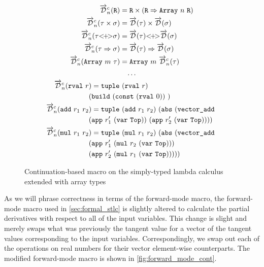   \begin{figure}
    \centering
    \begin{gather*}
      \begin{aligned}
        \overrightarrow{\mathcal{D}}^c_n(\texttt{R}) &= \texttt{R} \times (\texttt{R} \Rightarrow \texttt{Array}\ n\ \texttt{R}) \\
        \overrightarrow{\mathcal{D}}^c_n(\tau \times \sigma) &= \overrightarrow{\mathcal{D}}(\tau) \times \overrightarrow{\mathcal{D}}(\sigma) \\
        \overrightarrow{\mathcal{D}}^c_n(\tau {<}\!{+}\!{>} \sigma) &= \overrightarrow{\mathcal{D}}(\tau) {<}\!{+}\!{>} \overrightarrow{\mathcal{D}}(\sigma) \\
        \overrightarrow{\mathcal{D}}^c_n(\tau \Rightarrow \sigma) &= \overrightarrow{\mathcal{D}}(\tau) \Rightarrow \overrightarrow{\mathcal{D}}(\sigma) \\
        \overrightarrow{\mathcal{D}}^c_n(\texttt{Array}\ m\ \tau) &= \texttt{Array}\ m\ \overrightarrow{\mathcal{D}}^c_n(\tau) \\
      \end{aligned}
      \\
      \begin{gathered}
        \dots \\
        \begin{aligned}
        \overrightarrow{\mathcal{D}}^c_n(\texttt{rval}\ r&) = \texttt{tuple}\ (\texttt{rval}\ r)\ \\
          &{(\texttt{build}\ (\texttt{const}\ (\texttt{rval}\ 0))\ )} \\
        \overrightarrow{\mathcal{D}}^c_n(\texttt{add}\ r_1\ r_2&) = \texttt{tuple}\ (\texttt{add}\ r_1\ r_2)\ (\texttt{abs}\ (\texttt{vector\_add}\  \\
          &(\texttt{app}\ r_1'\ (\texttt{var}\ \texttt{Top}))\ (\texttt{app}\ r_2'\ (\texttt{var}\ \texttt{Top})))) \\
        \overrightarrow{\mathcal{D}}^c_n(\texttt{mul}\ r_1\ r_2&) = \texttt{tuple}\ (\texttt{mul}\ r_1\ r_2)\ (\texttt{abs}\ (\texttt{vector\_add}\  \\
          &(\texttt{app}\ r_1'\ (\texttt{mul}\ r_2\ (\texttt{var}\ \texttt{Top})))\  \\
          &(\texttt{app}\ r_2'\ (\texttt{mul}\ r_1\ (\texttt{var}\ \texttt{Top}))))) \\
        \end{aligned}
      \end{gathered}
    \end{gather*}
    \caption{Continuation-based macro on the simply-typed lambda calculus extended with array types}
    \label{fig:continuation_macro}
  \end{figure}

  As we will phrase correctness in terms of the forward-mode macro, the forward-mode macro used in \cref{sec:formal_stlc} is slightly altered to calculate the partial derivatives with respect to all of the input variables.
  This change is slight and merely swaps what was previously the tangent value for a vector of the tangent values corresponding to the input variables.
  Correspondingly, we swap out each of the operations on real numbers for their vector element-wise counterparts.
  The modified forward-mode macro is shown in \cref{fig:forward_mode_cont}.

